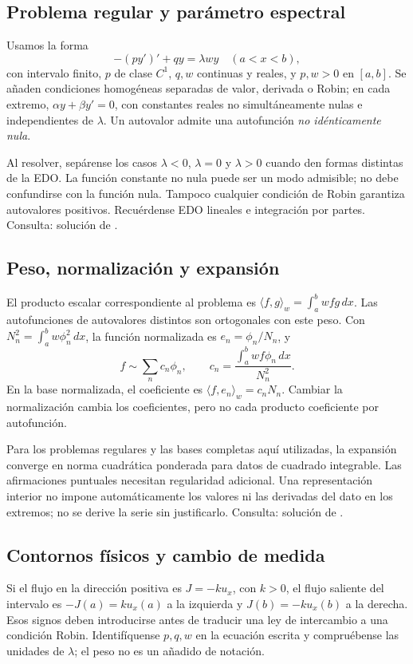 %
\subsection*{Problema regular y parámetro espectral}
\label{CH09-B01}
Usamos la forma
\[
 -(p y')'+q y=\lambda w y\quad (a<x<b),
\]
con intervalo finito, $p$ de clase $C^1$, $q,w$ continuas y reales,
y $p,w>0$ en $[a,b]$. Se añaden condiciones homogéneas separadas
de valor, derivada o Robin; en cada extremo,
$\alpha y+\beta y'=0$, con constantes reales no simultáneamente nulas
e independientes de $\lambda$. Un autovalor admite una autofunción
\emph{no idénticamente nula}.

Al resolver, sepárense los casos $\lambda<0$, $\lambda=0$ y
$\lambda>0$ cuando den formas distintas de la EDO. La función constante
no nula puede ser un modo admisible; no debe confundirse con la función
nula. Tampoco cualquier condición de Robin garantiza autovalores
positivos. Recuérdense EDO lineales e integración por partes.
Consulta: solución de .

%
\subsection*{Peso, normalización y expansión}
\label{CH09-B02}
El producto escalar correspondiente al problema es
$\langle f,g\rangle_w=\int_a^b wfg\,dx$.
Las autofunciones de autovalores distintos son ortogonales con este peso.
Con $N_n^2=\int_a^b w\phi_n^2\,dx$, la función normalizada es
$e_n=\phi_n/N_n$, y
\[
 f\sim\sum_n c_n\phi_n,\qquad
 c_n=\frac{\int_a^b wf\phi_n\,dx}{N_n^2}.
\]
En la base normalizada, el coeficiente es
$\langle f,e_n\rangle_w=c_nN_n$. Cambiar la normalización cambia los
coeficientes, pero no cada producto coeficiente por autofunción.

Para los problemas regulares y las bases completas aquí utilizadas,
la expansión converge en norma cuadrática ponderada para datos de
cuadrado integrable. Las afirmaciones puntuales necesitan regularidad
adicional. Una representación interior no impone automáticamente los
valores ni las derivadas del dato en los extremos; no se derive la serie
sin justificarlo. Consulta: solución de .

%
\subsection*{Contornos físicos y cambio de medida}
\label{CH09-B03}
Si el flujo en la dirección positiva es $J=-k u_x$, con $k>0$, el
flujo saliente del intervalo es $-J(a)=k u_x(a)$ a la izquierda y
$J(b)=-k u_x(b)$ a la derecha. Esos signos deben introducirse antes de
traducir una ley de intercambio a una condición Robin.
Identifíquense $p,q,w$ en la ecuación escrita y compruébense las unidades
de $\lambda$; el peso no es un añadido de notación.

